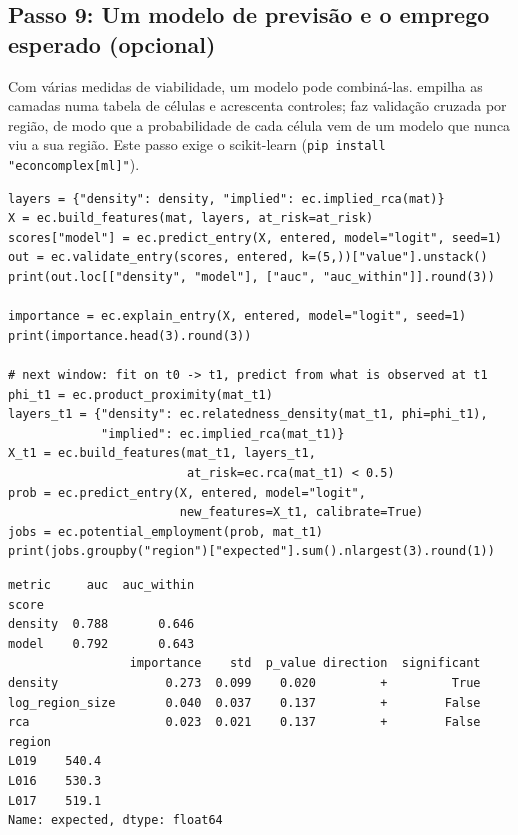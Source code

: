 \subsection{Passo 9: Um modelo de previsão e o emprego esperado (opcional)}

Com várias medidas de viabilidade, um modelo pode combiná-las.
 empilha as camadas numa tabela de células e
acrescenta controles;  faz validação cruzada por
região, de modo que a probabilidade de cada célula vem de um modelo que
nunca viu a sua região. Este passo exige o scikit-learn
(\texttt{pip install "econcomplex[ml]"}).

\begin{lstlisting}
layers = {"density": density, "implied": ec.implied_rca(mat)}
X = ec.build_features(mat, layers, at_risk=at_risk)
scores["model"] = ec.predict_entry(X, entered, model="logit", seed=1)
out = ec.validate_entry(scores, entered, k=(5,))["value"].unstack()
print(out.loc[["density", "model"], ["auc", "auc_within"]].round(3))

importance = ec.explain_entry(X, entered, model="logit", seed=1)
print(importance.head(3).round(3))

# next window: fit on t0 -> t1, predict from what is observed at t1
phi_t1 = ec.product_proximity(mat_t1)
layers_t1 = {"density": ec.relatedness_density(mat_t1, phi=phi_t1),
             "implied": ec.implied_rca(mat_t1)}
X_t1 = ec.build_features(mat_t1, layers_t1,
                         at_risk=ec.rca(mat_t1) < 0.5)
prob = ec.predict_entry(X, entered, model="logit",
                        new_features=X_t1, calibrate=True)
jobs = ec.potential_employment(prob, mat_t1)
print(jobs.groupby("region")["expected"].sum().nlargest(3).round(1))
\end{lstlisting}
\begin{lstlisting}[language={}, numbers=none, backgroundcolor=\color{white}, frame=leftline, framerule=2pt, rulecolor=\color{noteborder}, xleftmargin=1.5em]
metric     auc  auc_within
score                     
density  0.788       0.646
model    0.792       0.643
                 importance    std  p_value direction  significant
density               0.273  0.099    0.020         +         True
log_region_size       0.040  0.037    0.137         +        False
rca                   0.023  0.021    0.137         +        False
region
L019    540.4
L016    530.3
L017    519.1
Name: expected, dtype: float64
\end{lstlisting}

